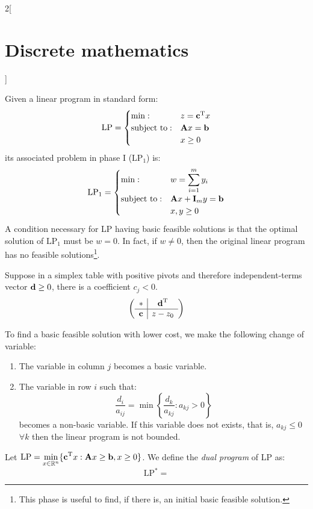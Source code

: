 \documentclass[../../../main.tex]{subfiles}
\begin{document}
\begin{multicols}{2}[\section{Discrete mathematics}]
  \begin{definition}
    Given a linear program in standard form:
    $$\text{LP}=
      \begin{cases}
        \min:              & z=\vb{\boldsymbol{\mathrm{c}}}^{\mathrm{T}}x \\
        \text{subject to}: & \boldsymbol{\mathrm{A}}x=\boldsymbol{\mathrm{b}}        \\
                           & x\geq 0
      \end{cases}$$ its associated problem in phase I ($\text{LP}_1$) is: $$\text{LP}_1=
      \begin{cases}
        \min:              & \displaystyle w=\sum_{i=1}^my_i \\
        \text{subject to}: & \boldsymbol{\mathrm{A}}x+\boldsymbol{\mathrm{I}}_my=\boldsymbol{\mathrm{b}}        \\
                           & x,y\geq 0
      \end{cases}$$
    A condition necessary for LP having basic feasible solutions is that the optimal solution of $\text{LP}_1$ must be $w=0$. In fact, if $w\ne 0$, then the original linear program has no feasible solutions\footnote{This phase is useful to find, if there is, an initial basic feasible solution.}.
  \end{definition}
  \begin{proposition}
    Suppose in a simplex table with positive pivots and therefore independent-terms vector $\boldsymbol{\mathrm{d}}\geq 0$, there is a coefficient $c_j<0$. $$\left(\begin{array}{c|c}
          *      & \vb{\boldsymbol{\mathrm{d}}}^{\mathrm{T}} \\
          \hline
          \boldsymbol{\mathrm{c}} & z-z_0
        \end{array}\right)$$
  \end{proposition}
  To find a basic feasible solution with lower cost, we make the following change of variable:
  \begin{enumerate}
    \item The variable in column $j$ becomes a basic variable.
    \item The variable in row $i$ such that: $$\frac{d_i}{a_{ij}}=\min\left\{\frac{d_k}{a_{kj}}:a_{kj}>0\right\}$$ becomes a non-basic variable. If this variable does not exists, that is, $a_{kj}\leq0$ $\forall k$ then the linear program is not bounded.
  \end{enumerate}
  \begin{definition}
    Let $\text{LP}=\displaystyle\min_{x\in\mathbb{R} ^n}\{\vb{\boldsymbol{\mathrm{c}}}^{\mathrm{T}}x:\boldsymbol{\mathrm{A}}x\geq \boldsymbol{\mathrm{b}},x\geq 0\}$. We define the \emph{dual program} of LP as: $$\text{LP}^*=
$$
\end{definition}
\end{multicols}
\end{document}
